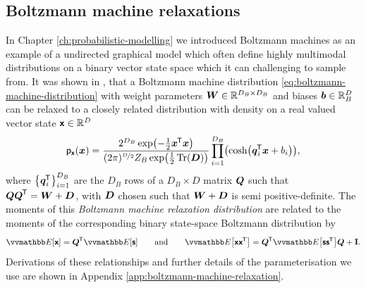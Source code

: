 %

\subsection{Boltzmann machine relaxations}\label{subsec:exp-bm-relaxations}

In Chapter \ref{ch:probabilistic-modelling} we introduced Boltzmann machines as an example of a undirected graphical model which often define highly multimodal distributions on a binary vector state space which it can challenging to sample from. It was shown in \citep{zhang2012continuous}, that a Boltzmann machine distribution \eqref{eq:boltzmann-machine-distribution} with weight parameters $\boldsymbol{W}\in \mathbb{R}^{D_B \times D_B}$ and biases $\boldsymbol{b} \in \mathbb{R}^D_B$ can be relaxed to a closely related distribution with density on a real valued vector state $\boldsymbol{\mathsf{x}} \in \mathit{\mathbb{R}^D}$
\begin{equation}\label{eq:bmr-density}
  \pden{\rvct{x}}(\vct{x}) =
  \frac
  {2^{D_B} \exp\lpa -\frac{1}{2} \vct{x}\tr\vct{x} \rpa }
  {(2\pi)^{\nicefrac{D}{2}} Z_B \exp\lpa\frac{1}{2}\Tr(\mtx{D})\rpa} 
  \prod_{i=1}^{D_B} \lpa \cosh\lpa\vct{q}_i\tr\vct{x} + b_i \rpa\rpa,
\end{equation}
where $\fset{\vct{q}_i\tr}_{i=1}^{D_B}$ are the $D_B$ rows of a $D_B \times D$ matrix $\boldsymbol{Q}$ such that $\boldsymbol{Q}\boldsymbol{Q}^{\mkern-1.5mu\mathsf{T}} = \boldsymbol{W} + \boldsymbol{D}$, with $\boldsymbol{D}$ chosen such that $\boldsymbol{W} + \boldsymbol{D}$ is semi positive-definite. The moments of this \emph{Boltzmann machine relaxation distribution} are related to the moments of the corresponding binary state-space Boltzmann distribution by
\begin{equation}\label{eq:bmr-moments-relationship}
  \expc{\rvct{x}} = \mtx{Q}\tr \expc{\rvct{s}}
  \qquad\textrm{and}\qquad
  \expc{\rvct{x}\rvct{x}\tr} = \mtx{Q}\tr\expc{\rvct{s}\rvct{s}\tr}\mtx{Q} + \idmtx.
\end{equation}
Derivations of these relationships and further details of the parameterisation we use are shown in Appendix \ref{app:boltzmann-machine-relaxation}.

